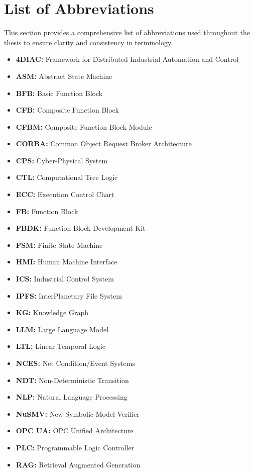 \section{List of Abbreviations}

This section provides a comprehensive list of abbreviations used throughout the thesis to ensure clarity and consistency in terminology.

\begin{itemize}
\item \textbf{4DIAC:} Framework for Distributed Industrial Automation and Control
\item \textbf{ASM:} Abstract State Machine
\item \textbf{BFB:} Basic Function Block
\item \textbf{CFB:} Composite Function Block
\item \textbf{CFBM:} Composite Function Block Module
\item \textbf{CORBA:} Common Object Request Broker Architecture
\item \textbf{CPS:} Cyber-Physical System
\item \textbf{CTL:} Computational Tree Logic
\item \textbf{ECC:} Execution Control Chart
\item \textbf{FB:} Function Block
\item \textbf{FBDK:} Function Block Development Kit
\item \textbf{FSM:} Finite State Machine
\item \textbf{HMI:} Human Machine Interface
\item \textbf{ICS:} Industrial Control System
\item \textbf{IPFS:} InterPlanetary File System
\item \textbf{KG:} Knowledge Graph
\item \textbf{LLM:} Large Language Model
\item \textbf{LTL:} Linear Temporal Logic
\item \textbf{NCES:} Net Condition/Event Systems
\item \textbf{NDT:} Non-Deterministic Transition
\item \textbf{NLP:} Natural Language Processing
\item \textbf{NuSMV:} New Symbolic Model Verifier
\item \textbf{OPC UA:} OPC Unified Architecture
\item \textbf{PLC:} Programmable Logic Controller
\item \textbf{RAG:} Retrieval Augmented Generation

\end{itemize}
